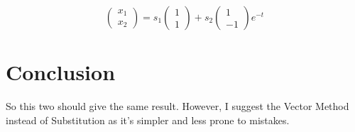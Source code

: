 \documentclass[12pt,letterpaper]{article}
\newcommand{\vectors}[2]{
	\begin{pmatrix}
		#1 \\ #2
	\end{pmatrix}
}
\begin{document}
		\begin{equation}
			\vectors{x_1}{x_2} = s_1 \vectors{1}{1}  + s_2 \vectors{1}{-1} e^{ - t}
		\end{equation}

	\section{Conclusion}

		So this two should give the same result. However, I suggest the Vector Method instead of Substitution as it's simpler and less prone to mistakes. 

	\nocite{*}
	\printbibliography

	
	
\end{document}
